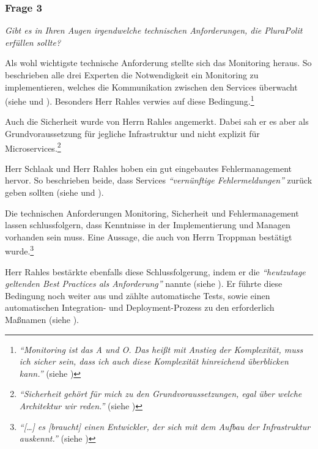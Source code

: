 \subsubsection{Frage 3}
\label{sec:frage3}

\textit{Gibt es in Ihren Augen irgendwelche technischen Anforderungen, die PluraPolit erfüllen sollte?}

Als wohl wichtigste technische Anforderung stellte sich das Monitoring heraus. So beschrieben alle drei Experten die Notwendigkeit ein Monitoring zu implementieren, welches die Kommunikation zwischen den Services überwacht (siehe  und ). Besonders Herr Rahles verwies auf diese Bedingung.\footnote{
\textit{\enquote{Monitoring ist das A und O. Das heißt mit Anstieg der Komplexität, muss ich sicher sein, dass ich auch diese Komplexität hinreichend überblicken kann.}} (siehe )
}

Auch die Sicherheit wurde von Herrn Rahles angemerkt. Dabei sah er es aber als Grundvoraussetzung für jegliche Infrastruktur und nicht explizit für Microservices.\footnote{
\textit{\enquote{Sicherheit gehört für mich zu den Grundvoraussetzungen, egal über welche Architektur wir reden.}} (siehe )
}

Herr Schlaak und Herr Rahles hoben ein gut eingebautes Fehlermanagement hervor. So beschrieben beide, dass Services \textit{\enquote{vernünftige Fehlermeldungen}} zurück geben sollten (siehe  und ).

Die technischen Anforderungen Monitoring, Sicherheit und Fehlermanagement lassen schlussfolgern, dass Kenntnisse in der Implementierung und Managen vorhanden sein muss. Eine Aussage, die auch von Herrn Troppman bestätigt wurde.\footnote{
\textit{\enquote{[…] es [braucht] einen Entwickler, der sich mit dem Aufbau der Infrastruktur auskennt.}} (siehe )
}

Herr Rahles bestärkte ebenfalls diese Schlussfolgerung, indem er die \textit{\enquote{heutzutage geltenden Best Practices als Anforderung}} nannte (siehe ). Er führte diese Bedingung noch weiter aus und zählte automatische Tests, sowie einen automatischen Integration- und Deployment-Prozess zu den erforderlich Maßnamen (siehe ).
